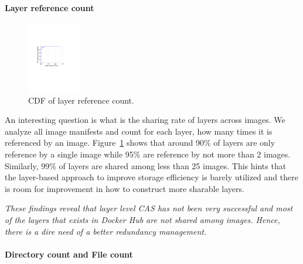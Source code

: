\paragraph{Layer reference count}

\begin{figure}
	\centering
	\includegraphics[width=0.21\textwidth]{graphs/shared-cnt-cdf.pdf}
	\caption{CDF of layer reference count.
	}
	\label{fig:ref_count}
\end{figure}

An interesting question is what is the sharing rate of layers across images.
We analyze all image manifests and count for each layer, how many times it is
referenced by an image. Figure~\ref{fig:ref_count} shows that around 90\% of
layers are only reference by a single image while 95\% are reference by not
more than 2 images. Similarly, 99\% of layers are shared among less than 25
images. 
This hints that the
layer-based approach to improve storage efficiency is barely utilized and there
is room for improvement in how to construct more sharable layers.

\emph{These findings reveal that layer level CAS has not been very successful
	and most of the layers that exists in Docker Hub are not shared among images.
	Hence, there is a dire need of a better redundancy management.}


\paragraph{Directory count and File count}

